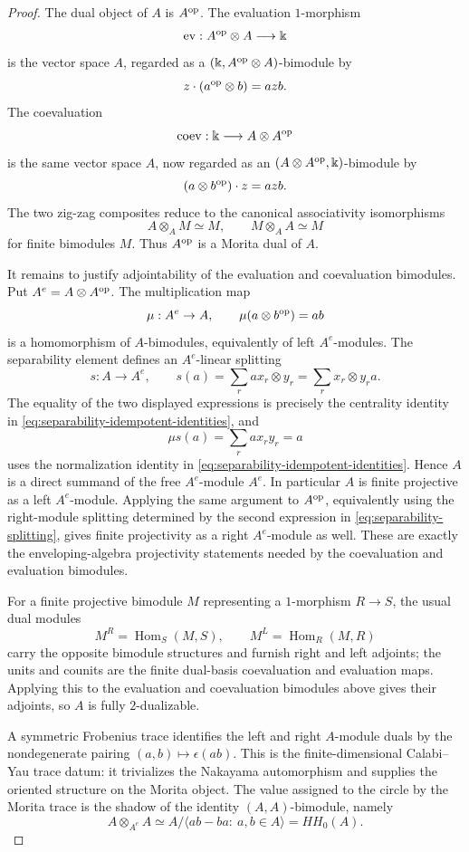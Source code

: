 \begin{proof}
The dual object of \(A\) is \(A^{\rm op}\).  The evaluation \(1\)-morphism
\[
  {\rm ev}:A^{\rm op}\otimes A\longrightarrow \Bbbk
\]
is the vector space \(A\), regarded as a
\((\Bbbk,A^{\rm op}\otimes A)\)-bimodule by
\[
  z\cdot(a^{\rm op}\otimes b)=azb.
\]
The coevaluation
\[
  {\rm coev}:\Bbbk\longrightarrow A\otimes A^{\rm op}
\]
is the same vector space \(A\), now regarded as an
\((A\otimes A^{\rm op},\Bbbk)\)-bimodule by
\[
  (a\otimes b^{\rm op})\cdot z=azb.
\]
The two zig-zag composites reduce to the canonical associativity
isomorphisms
\[
  A\otimes_A M\simeq M,
  \qquad
  M\otimes_A A\simeq M
\]
for finite bimodules \(M\).  Thus \(A^{\rm op}\) is a Morita dual of \(A\).

It remains to justify adjointability of the evaluation and coevaluation
bimodules.  Put \(A^e=A\otimes A^{\rm op}\).  The multiplication map
\[
  \mu:A^e\to A,\qquad \mu(a\otimes b^{\rm op})=ab
\]
is a homomorphism of \(A\)-bimodules, equivalently of left \(A^e\)-modules.
The separability element defines an \(A^e\)-linear splitting
\begin{equation}
  s:A\to A^e,
  \qquad
  s(a)=\sum_r ax_r\otimes y_r
      =\sum_r x_r\otimes y_ra .
  \label{eq:separability-splitting}
\end{equation}
The equality of the two displayed expressions is precisely the centrality
identity in \eqref{eq:separability-idempotent-identities}, and
\[
  \mu s(a)=\sum_r ax_ry_r=a
\]
uses the normalization identity in
\eqref{eq:separability-idempotent-identities}.  Hence \(A\) is a direct
summand of the free \(A^e\)-module \(A^e\).  In particular \(A\) is finite
projective as a left \(A^e\)-module.  Applying the same argument to
\(A^{\rm op}\), equivalently using the right-module splitting determined by
the second expression in \eqref{eq:separability-splitting}, gives finite
projectivity as a right \(A^e\)-module as well.  These are exactly the
enveloping-algebra projectivity statements needed by the coevaluation and
evaluation bimodules.

For a finite projective bimodule \(M\) representing a \(1\)-morphism
\(R\to S\), the usual dual modules
\[
  M^R=\operatorname{Hom}_{S}(M,S),
  \qquad
  M^L=\operatorname{Hom}_{R}(M,R)
\]
carry the opposite bimodule structures and furnish right and left adjoints;
the units and counits are the finite dual-basis coevaluation and evaluation
maps.  Applying this to the evaluation and coevaluation bimodules above gives
their adjoints, so \(A\) is fully \(2\)-dualizable.

A symmetric Frobenius trace identifies the left and right \(A\)-module duals
by the nondegenerate pairing \((a,b)\mapsto\epsilon(ab)\).  This is the
finite-dimensional Calabi--Yau trace datum: it trivializes the Nakayama
automorphism and supplies the oriented structure on the Morita object.  The
value assigned to the circle by the Morita trace is the shadow of the identity
\((A,A)\)-bimodule, namely
\[
  A\otimes_{A^e}A\simeq A/\langle ab-ba:\ a,b\in A\rangle=HH_0(A).
\]
\end{proof}

